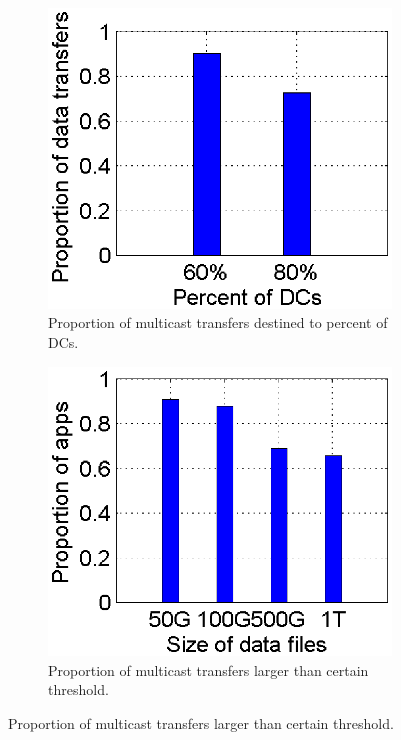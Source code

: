 \begin{figure}[t]
        \centering
        \begin{subfigure}[b]{0.23\textwidth}
                \centering
                \includegraphics[width=\textwidth]{images/destinationDC_v2.eps}%
                \caption{Proportion of multicast transfers destined to percent of DCs.}
                \label{fig:bulk:dest}
        \end{subfigure}
	\hspace{0.1cm}
        \begin{subfigure}[b]{0.23\textwidth}
                \centering
                \includegraphics[width=\textwidth]{images/DataSize_v2.eps}
                \caption{Proportion of multicast transfers larger than certain threshold.}
                \label{fig:bulk:size}
        \end{subfigure}
        \label{fig:bulk}
\end{figure}

